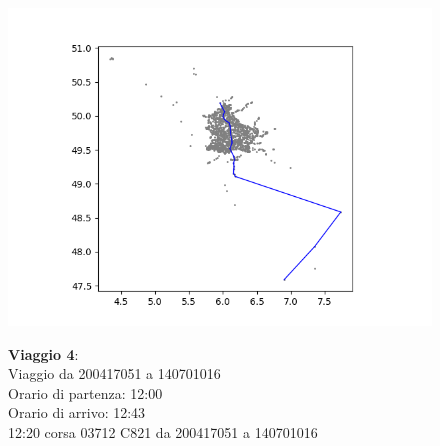\documentclass{article}
\begin{document}
\begin{figure}[H]
	\begin{minipage}{0.55\linewidth}
		\centering
		\hspace*{-6cm}\includegraphics[width=1.0\linewidth, valign=t]{figures/Figure_1}
	\end{minipage}
	\hspace*{-4cm}\begin{minipage}{0.7\linewidth}
		\textbf{Viaggio 4}:\\
		Viaggio da 200417051 a 140701016\\
		Orario di partenza: 12:00\\
		Orario di arrivo: 12:43\\
		12:20 corsa 03712 C821 da 200417051 a 140701016
		
			\end{minipage}
\end{figure}
\end{document}
